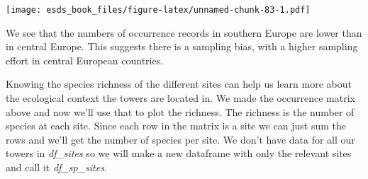 \documentclass[
]{book}
\newenvironment{Shaded}{\begin{snugshade}}{\end{snugshade}}
\newcommand{\DataTypeTok}[1]{\textcolor[rgb]{0.13,0.29,0.53}{#1}}
\newcommand{\KeywordTok}[1]{\textcolor[rgb]{0.13,0.29,0.53}{\textbf{#1}}}
\newcommand{\NormalTok}[1]{#1}
\newcommand{\OperatorTok}[1]{\textcolor[rgb]{0.81,0.36,0.00}{\textbf{#1}}}
\newcommand{\OtherTok}[1]{\textcolor[rgb]{0.56,0.35,0.01}{#1}}
\newcommand{\StringTok}[1]{\textcolor[rgb]{0.31,0.60,0.02}{#1}}
\begin{document}
\begin{Shaded}
\end{Shaded}

\texttt{[image: esds\_book\_files/figure-latex/unnamed-chunk-83-1.pdf]}

We see that the numbers of occurrence records in southern Europe are lower than in central Europe. This suggests there is a sampling bias, with a higher sampling effort in central European countries.

Knowing the species richness of the different sites can help us learn more about the ecological context the towers are located in. We made the occurrence matrix above and now we'll use that to plot the richness. The richness is the number of species at each site. Since each row in the matrix is a site we can just sum the rows and we'll get the number of species per site. We don't have data for all our towers in \emph{df\_sites} so we will make a new dataframe with only the relevant sites and call it \emph{df\_sp\_sites}.
\end{document}
